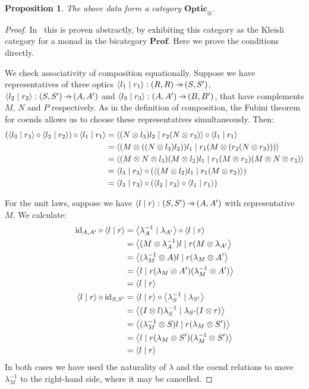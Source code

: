\documentclass[11pt,a4paper]{article}
\theoremstyle{plain}
\newtheorem{proposition}[theorem]{Proposition}
\theoremstyle{definition}
\newcommand{\Prof}{\mathbf{Prof}}
\newcommand{\Optic}{\mathbf{Optic}}
\newcommand{\id}{\mathrm{id}}
\newcommand{\rep}[2]{{\ensuremath \left\langle #1 \mid #2 \right\rangle}}
\newcommand{\hto}{\ensuremath{\,\mathaccent\shortmid\rightarrow\,}}
\begin{document}
\begin{proposition}\label{prop-optic-is-cat}
  The above data form a category $\Optic_\otimes$.
\end{proposition}
\begin{proof}
  In~\cite[Section 6]{Doubles} this is proven abstractly, by exhibiting this category as the Kleisli category for a monad in the bicategory $\Prof$. Here we prove the conditions directly.

  We check associativity of composition equationally.  Suppose we have representatives of three optics $\rep{l_1}{r_1} : (R, R) \hto (S, S')$, $\rep{l_2}{r_2} : (S, S') \hto (A, A')$ and $\rep{l_3}{r_3} : (A, A') \hto (B, B')$, that have complements $M$, $N$ and $P$ respectively. As in the definition of composition, the Fubini theorem for coends allows us to choose these representatives simultaneously. Then:
  \begin{align*}
    (\rep{l_3}{r_3} \circ \rep{l_2}{r_2}) \circ \rep{l_1}{r_1}
    &= \rep{(N \otimes l_3)l_2}{r_2(N \otimes r_3)} \circ \rep{l_1}{r_1} \\
    &= \rep{(M \otimes ((N \otimes l_3)l_2))l_1}{r_1(M \otimes (r_2(N \otimes r_3)))} \\
    &= \rep{(M \otimes N \otimes l_3)(M \otimes l_2)l_1}{r_1(M \otimes r_2)(M \otimes N \otimes r_3)} \\
    &= \rep{l_3}{r_3} \circ (\rep{(M \otimes l_2)l_1}{r_1(M \otimes r_2)}) \\
    &= \rep{l_3}{r_3} \circ (\rep{l_2}{r_2} \circ \rep{l_1}{r_1})
  \end{align*}

  For the unit laws, suppose we have $\rep{l}{r} : (S, S') \hto (A, A')$ with representative $M$. We calculate:
  \begin{align*}
    \id_{A, A'} \circ \rep{l}{r}
    &= \rep{\lambda^{-1}_A}{\lambda_{A'}} \circ \rep{l}{r} \\
    &= \rep{(M \otimes \lambda^{-1}_A) l}{r (M\otimes  \lambda_{A'}} \\
    &= \rep{(\lambda^{-1}_M \otimes  A) l}{r (\lambda_M \otimes A'} \\
    &= \rep{l}{r (\lambda_M \otimes A') (\lambda^{-1}_M \otimes A')} \\
    &= \rep{l}{r} \\
    \rep{l}{r} \circ \id_{S, S'}
    &= \rep{l}{r} \circ \rep{\lambda^{-1}_S}{\lambda_{S'}}  \\
    &= \rep{(I \otimes l)\lambda^{-1}_S}{\lambda_{S'} (I \otimes r)} \\
    &= \rep{(\lambda^{-1}_M \otimes S)l}{r (\lambda_{M} \otimes S')} \\
    &= \rep{l}{r (\lambda_{M} \otimes S')(\lambda^{-1}_M \otimes S')} \\
    &= \rep{l}{r}
  \end{align*}
  In both cases we have used the naturality of $\lambda$ and the coend relations to move $\lambda^{-1}_M$ to the right-hand side, where it may be cancelled.
\end{proof}
\end{document}
